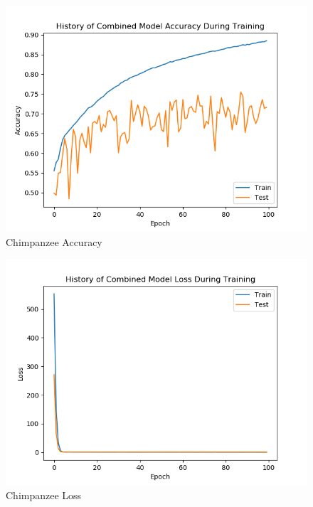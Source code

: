 \documentclass[11pt]{article}
\begin{document}

\newpage


\begin{figure}
    \includegraphics[width=17cm]{ChimpAcc.png}
  \caption{Chimpanzee Accuracy}
\end{figure}

\begin{figure}
    \includegraphics[width=17cm]{ChimpLoss.png}
  \caption{Chimpanzee Loss}
\end{figure}
\end{document}
